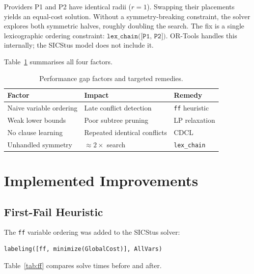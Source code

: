 \documentclass{llncs}
\begin{document}
Providers P1 and P2 have identical radii ($r{=}1$). Swapping their placements
yields an equal-cost solution. Without a symmetry-breaking constraint, the
solver explores both symmetric halves, roughly doubling the search.
The fix is a single lexicographic ordering constraint:
$\texttt{lex\_chain([P1, P2])}$.
OR-Tools handles this internally; the SICStus model does not include it.

Table~\ref{tab:factors} summarises all four factors.

\begin{table}[H]
\centering
\caption{Performance gap factors and targeted remedies.}
\label{tab:factors}
\begin{tabular}{lll}
\toprule
\textbf{Factor} & \textbf{Impact} & \textbf{Remedy} \\
\midrule
Naive variable ordering & Late conflict detection    & \texttt{ff} heuristic \\
Weak lower bounds       & Poor subtree pruning       & LP relaxation \\
No clause learning      & Repeated identical conflicts & CDCL \\
Unhandled symmetry      & ${\approx}2{\times}$ search & \texttt{lex\_chain} \\
\bottomrule
\end{tabular}
\end{table}

\section{Implemented Improvements}
\label{sec:improvements}

\subsection{First-Fail Heuristic}
\label{sec:ff}

The \texttt{ff} variable ordering was added to the SICStus solver:

\begin{lstlisting}[style=prolog]
labeling([ff, minimize(GlobalCost)], AllVars)
\end{lstlisting}

Table~\ref{tab:ff} compares solve times before and after.
\end{document}
